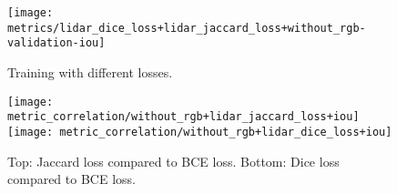 \begin{figure}[H]
  \centering
  \texttt{[image: metrics/lidar\_dice\_loss+lidar\_jaccard\_loss+without\_rgb-validation-iou]}
  \caption{%
    Training with different losses.
  }
\end{figure}

\begin{figure}[H]
  \centering
  \texttt{[image: metric\_correlation/without\_rgb+lidar\_jaccard\_loss+iou]}
  \texttt{[image: metric\_correlation/without\_rgb+lidar\_dice\_loss+iou]}
  \caption{%
    Top: Jaccard loss compared to BCE loss.
    Bottom: Dice loss compared to BCE loss.
  }
\end{figure}
